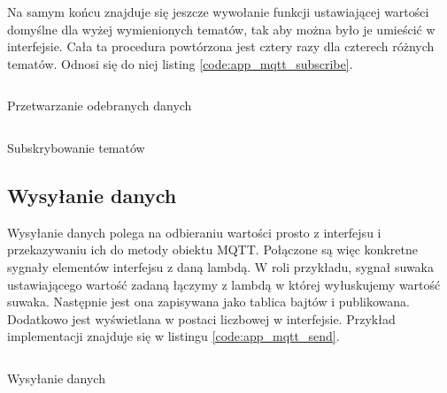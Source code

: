         Na samym końcu znajduje się jeszcze wywołanie funkcji ustawiającej wartości domyślne dla wyżej wymienionych tematów, tak aby można było je umieścić w interfejsie. Cała ta procedura powtórzona jest cztery razy dla czterech różnych tematów. Odnosi się do niej listing \ref{code:app_mqtt_subscribe}. 
        
        
        \begin{kod}
          \inputminted[firstline=245, lastline=254]{cpp}{app/listings/mainwindow.cpp}
          \caption{Przetwarzanie odebranych danych}
          \label{code:app_mqtt_setValue}
        \end{kod}
        
      
        \begin{kod}
          \inputminted[firstline=186, lastline=205]{cpp}{app/listings/mainwindow.cpp}
          \caption{Subskrybowanie tematów}
          \label{code:app_mqtt_subscribe}
          \vspace{1em}
        \end{kod}
        
        
      \subsection{Wysyłanie danych}
        Wysyłanie danych polega na odbieraniu wartości prosto z interfejsu i przekazywaniu ich do metody obiektu MQTT. Połączone są więc konkretne sygnały elementów interfejsu z daną lambdą. W roli przykładu, sygnał suwaka ustawiającego wartość zadaną łączymy z lambdą w której wyłuskujemy wartość suwaka. Następnie jest ona zapisywana jako tablica bajtów i publikowana. Dodatkowo jest wyświetlana w postaci liczbowej w interfejsie. Przykład implementacji znajduje się w listingu \ref{code:app_mqtt_send}.
        
        \begin{kod}
          \inputminted[firstline=208, lastline=235]{cpp}{app/listings/mainwindow.cpp}
          \caption{Wysyłanie danych}
          \label{code:app_mqtt_send}
          \vspace{2em}
        \end{kod}       
        